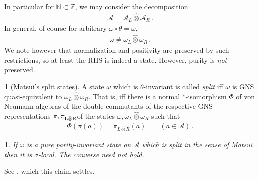 \documentclass[a4paper,10pt]{article}
\numberwithin{equation}{section}
\theoremstyle{plain}
\theoremstyle{plain}
\theoremstyle{plain}
\theoremstyle{plain}
\theoremstyle{plain}
\newtheorem{claim}[claim]{\protect\claimname}
\theoremstyle{remark}
\theoremstyle{definition}
\newtheorem{defn}[defn]{\protect\definitionname}
\providecommand{\claimname}{Claim}
\providecommand{\definitionname}{Definition}
\newcommand{\ZZ}{\mathbb{Z}}
\newcommand{\NN}{\mathbb{N}}
\newcommand{\calA}{\mathcal{A}}
\newcommand{\eq}[1]{\begin{align*}#1\end{align*}}
\newcommand{\eql}[1]{\begin{align}#1\end{align}}
\begin{document}
In particular for $\NN\subset\ZZ$, we may consider the decomposition \eql{\label{eq:left right decomposition for the algebra}
\calA = \calA_L \hat{\otimes}\calA_R\,.
} In general, of course for arbitrary $\omega\circ\theta=\omega$,
\eq{
\omega\neq\omega_L\hat{\otimes}\omega_R\,.
} We note however that normalization and positivity are preserved by such restrictions, so at least the RHS is indeed a state. However, purity is \emph{not} preserved.
\begin{defn}[Matsui's split states]
    A state $\omega$ which is $\theta$-invariant is called \emph{split} iff $\omega$ is GNS quasi-equivalent to $\omega_L\hat{\otimes}\omega_R$. That is, iff there is a normal *-isomorphism $\Phi$ of von Neumann algebras of the double-commutants of the respective GNS representations $\pi,\pi_{\rm L\hat{\otimes} R}$of the states $\omega,\omega_L\hat{\otimes}\omega_R$ such that \eq{
    \Phi(\pi(a)) = \pi_{L\hat{\otimes} R}(a)\qquad(a\in\calA)\,.
    }
\end{defn}
\begin{claim}
    If $\omega$ is a pure parity-invariant state on $\calA$ which is split in the sense of Matsui then it is $\sigma$-local. The converse need not hold. 
\end{claim}
See \cite[Remark 3.4]{Matsui2020SplitFermionicString}, which this claim settles.
\end{document}
